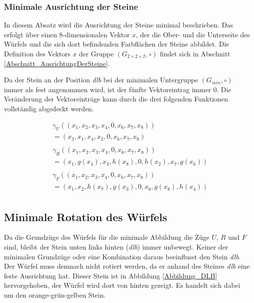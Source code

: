 \documentclass[12pt,a4paper, usenames, dvipsnames]{article}
\theoremstyle{mystyle}
\theoremstyle{definition}
\newcommand{\Gtwo}{\ensuremath{G_{2\times 2\times 2}}}
\begin{document}
\subsubsection*{Minimale Ausrichtung der Steine}

In diesem Absatz wird die Ausrichtung der Steine minimal beschrieben. Das erfolgt über einen 8-dimensionalen Vektor $x$, der die Ober- und die Unterseite des Würfels und die sich dort befindenden Farbflächen der Steine abbildet. Die Definition des Vektors $x$ der Gruppe $(\Gtwo, \circ)$ findet sich in Abschnitt \ref{Abschnitt_AusrichtungDerSteine}.

Da der Stein an der Position \textit{dlb} bei der minimalen Untergruppe $(G_{min}, \circ)$ immer als fest angenommen wird, ist der fünfte Vektoreintrag immer 0. 
Die Veränderung der Vektoreinträge kann durch die drei folgenden Funktionen vollständig abgedeckt werden.

\begin{align*}
& \gamma_U \left( (x_1, x_2, x_3, x_4, 0, x_6, x_7, x_8  ) \right) \\ 
& =  \left( x_3, x_1, x_4, x_2, 0, x_6, x_7, x_8 \right) \\
\\ 
& \gamma_R \left( (x_1, x_2, x_3, x_4, 0, x_6, x_7, x_8  ) \right) \\ 
& =  \left( x_1, g(x_4), x_3, h(x_8), 0, h(x_2), x_7, g(x_6) \right) \\ 
\\
& \gamma_F \left( (x_1, x_2, x_3, x_4, 0, x_6, x_7, x_8  ) \right) \\ 
& =  \left( x_1, x_2, h(x_7), g(x_3), 0, x_6, g(x_8), h(x_4) \right) \\
\end{align*}

%
%
%
%
%
%
%
%
%
%
%
%
%
%
%
%
%
%
\subsection{Minimale Rotation des Würfels}

\label{Abschnitt_minimaleRotation}



Da die Grundzüge des Würfels für die minimale Abbildung die Züge $U$, $R$ und $F$ sind, bleibt der Stein unten links hinten (\textit{dlb}) immer unbewegt. Keiner der minimalen Grundzüge oder eine Kombination daraus beeinflusst den Stein \textit{dlb}.
Der Würfel muss demnach nicht rotiert werden, da er anhand des Steines \textit{dlb} eine feste Ausrichtung hat. Dieser Stein ist in Abbildung \ref{Abbildung_DLB} hervorgehoben, der Würfel wird dort von hinten gezeigt. Es handelt sich dabei um den orange-grün-gelben Stein. 
\end{document}
